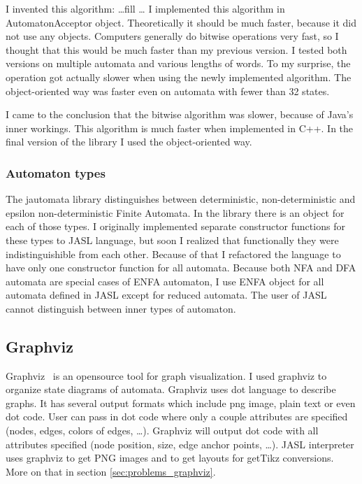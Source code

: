 \documentclass{ctuthesis}
\begin{document}
I invented this algorithm: \ldots fill \ldots %
I implemented this algorithm in AutomatonAcceptor object. Theoretically it should be much faster, because it did not use any objects. Computers generally do bitwise operations very fast, so I thought that this would be much faster than my previous version. I tested both versions on multiple automata and various lengths of words. To my surprise, the operation got actually slower when using the newly implemented algorithm. The object-oriented way was faster even on automata with fewer than 32 states. 

I came to the conclusion that the bitwise algorithm was slower, because of Java's inner workings. This algorithm is much faster when implemented in C++. In the final version of the library I used the object-oriented way.

\subsubsection{Automaton types}
The jautomata library distinguishes between deterministic, non-deterministic and epsilon non-deterministic Finite Automata. In the library there is an object for each of those types. I originally implemented separate constructor functions for these types to JASL language, but soon I realized that functionally they were indistinguishible from each other. Because of that I refactored the language to have only one constructor function for all automata. Because both NFA and DFA automata are special cases of ENFA automaton, I use ENFA object for all automata defined in JASL except for reduced automata. The user of JASL cannot distinguish between inner types of automaton.


\subsection{Graphviz}

Graphviz~\cite{graphviz} is an opensource tool for graph visualization. I used graphviz to organize state diagrams of automata. Graphviz uses dot language to describe graphs. It has several output formats which include png image, plain text or even dot code. User can pass in dot code where only a couple attributes are specified (nodes, edges, colors of edges, \ldots). Graphviz will output dot code with all attributes specified (node position, size, edge anchor points, \ldots).  JASL interpreter uses graphviz to get PNG images and to get layouts for getTikz conversions. More on that in section \ref{sec:problems_graphviz}.
\end{document}
